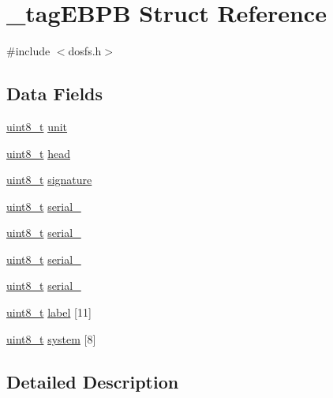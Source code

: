 \hypertarget{struct__tag_e_b_p_b}{\section{\-\_\-tag\-E\-B\-P\-B Struct Reference}
\label{struct__tag_e_b_p_b}
}


{\ttfamily \#include $<$dosfs.\-h$>$}

\subsection*{Data Fields}
\begin{DoxyCompactItemize}
\item 
\hyperlink{stdint_8h_aba7bc1797add20fe3efdf37ced1182c5}{uint8\-\_\-t} \hyperlink{struct__tag_e_b_p_b_a80e1472a2611c1705dfbfe41a29cb20b}{unit}
\item 
\hyperlink{stdint_8h_aba7bc1797add20fe3efdf37ced1182c5}{uint8\-\_\-t} \hyperlink{struct__tag_e_b_p_b_a797eed469b81e637435a6c260c890689}{head}
\item 
\hyperlink{stdint_8h_aba7bc1797add20fe3efdf37ced1182c5}{uint8\-\_\-t} \hyperlink{struct__tag_e_b_p_b_ae59851105956356926c52269b2c9cbe6}{signature}
\item 
\hyperlink{stdint_8h_aba7bc1797add20fe3efdf37ced1182c5}{uint8\-\_\-t} \hyperlink{struct__tag_e_b_p_b_a20c88e6e9746be8ac63672f2a2ff1ab5}{serial\-\_}
\item 
\hyperlink{stdint_8h_aba7bc1797add20fe3efdf37ced1182c5}{uint8\-\_\-t} \hyperlink{struct__tag_e_b_p_b_a4a0ef14d9943dd5edd16183125e2566d}{serial\-\_}
\item 
\hyperlink{stdint_8h_aba7bc1797add20fe3efdf37ced1182c5}{uint8\-\_\-t} \hyperlink{struct__tag_e_b_p_b_a96fb561bd2e7b51ec13b63e046469739}{serial\-\_}
\item 
\hyperlink{stdint_8h_aba7bc1797add20fe3efdf37ced1182c5}{uint8\-\_\-t} \hyperlink{struct__tag_e_b_p_b_a52a1ef5d0540fef62580490c05b896eb}{serial\-\_}
\item 
\hyperlink{stdint_8h_aba7bc1797add20fe3efdf37ced1182c5}{uint8\-\_\-t} \hyperlink{struct__tag_e_b_p_b_a71b31272ca2e5e4db7b48e21ba408ab4}{label} \mbox{[}11\mbox{]}
\item 
\hyperlink{stdint_8h_aba7bc1797add20fe3efdf37ced1182c5}{uint8\-\_\-t} \hyperlink{struct__tag_e_b_p_b_a2a59392bdae876528d5932c573295555}{system} \mbox{[}8\mbox{]}
\end{DoxyCompactItemize}


\subsection{Detailed Description}


